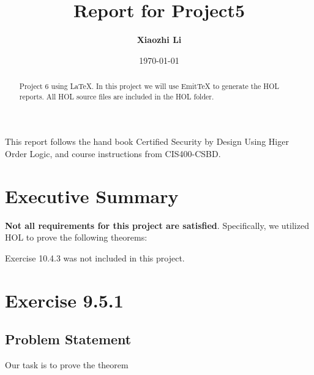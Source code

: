 \documentclass{report}
\title{Report for Project5}
\author{\textbf{Xiaozhi Li}}
\date{\today}
\begin{document}
\lstset{language=ML}


\maketitle{}

\begin{abstract}
  Project 6 using \LaTeX{}. In this project we will use EmitTeX to generate the HOL reports. All HOL source files are included in the HOL folder.
 \end{abstract}

\begin{acknowledgments}
 This report follows the hand book Certified Security by Design Using Higer Order Logic, and course instructions from CIS400-CSBD.
\end{acknowledgments}


\tableofcontents{}

\chapter{Executive Summary}


\textbf{Not all requirements for this project are satisfied}.
Specifically, we utilized HOL to prove the following theorems:
\begin{quote}
\HOLexerciseNineTheorems
\HOLexerciseOneZeroTheorems
\end{quote}

Exercise 10.4.3 was not included in this project.



\chapter{Exercise 9.5.1}
\label{ex 951}

\section{Problem Statement}

Our task is to prove the theorem
\HOLexerciseNineTheoremsabsorptionRule
\end{document}
